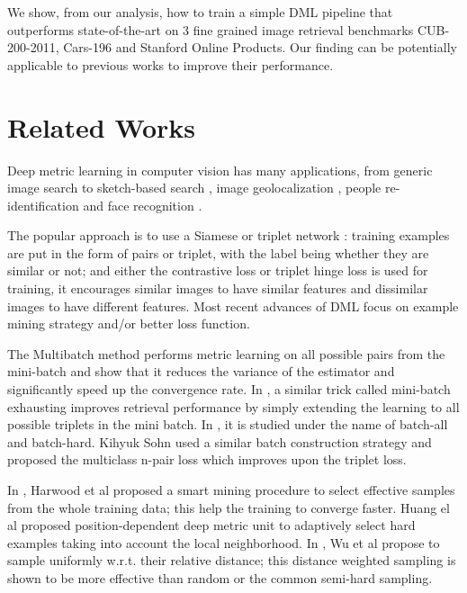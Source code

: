\documentclass[10pt,twocolumn,letterpaper]{article}
\begin{document}
We show, from our analysis, how to train a simple DML pipeline that outperforms state-of-the-art on 3 fine grained image retrieval benchmarks CUB-200-2011, Cars-196 and Stanford Online Products. Our finding can be potentially applicable to previous works to improve their performance.


\section{Related Works}

Deep metric learning in computer vision has many applications, from generic image search \cite{wang2014learning} to sketch-based search \cite{sangkloy2016sketchy}, image geolocalization \cite{vo2016localizing, vo2017revisiting}, people re-identification \cite{ding2015deep,hermans2017defense} and face recognition \cite{schroff2015facenet, Parkhi15}.

The popular approach is to use a Siamese \cite{bromley1994signature,chopra2005learning} or triplet network \cite{wu2013online,wang2014learning,vo2016localizing}: training examples are put in the form of pairs or triplet, with the label being whether they are similar or not; and either the contrastive loss or triplet hinge loss is used for training, it encourages similar images to have similar features and dissimilar images to have different features.
Most recent advances of DML focus on example mining strategy and/or better loss function.

The Multibatch method \cite{tadmor2016learning} performs metric learning on all possible pairs from the mini-batch and show that it reduces the variance of the estimator and significantly speed up the convergence rate. In \cite{vo2016localizing},
a similar trick called mini-batch exhausting improves retrieval performance by simply extending the learning to all possible triplets in the mini batch. In \cite{hermans2017defense}, it is studied under the name of batch-all and batch-hard. Kihyuk Sohn \cite{sohn2016improved} used a similar batch construction strategy and proposed the multiclass n-pair loss which improves upon the triplet loss.


In \cite{kumar2017smart}, Harwood et al proposed a smart mining procedure to select effective samples from the whole training data; this help the training to converge faster. 
Huang el al \cite{huang2016local} proposed position-dependent deep metric unit to adaptively select hard examples taking into account the local neighborhood.
In \cite{wu2017sampling}, Wu et al propose to sample uniformly w.r.t. 
their relative distance; this distance weighted sampling is shown to be more effective than random or the common semi-hard sampling.
\end{document}

